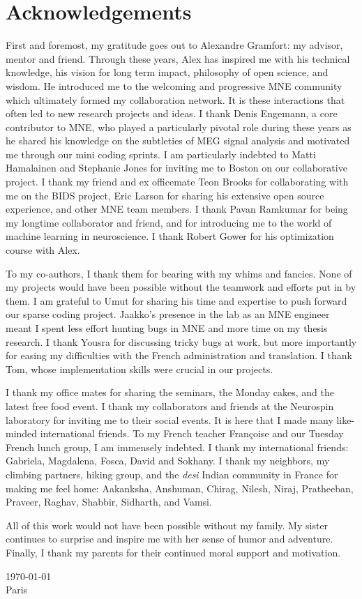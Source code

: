 \chapter*{Acknowledgements}
First and foremost, my gratitude goes out to Alexandre Gramfort: my advisor, mentor and friend. Through these years, Alex has inspired me with his technical knowledge, his vision for long term impact, philosophy of open science, and wisdom. He introduced me to the welcoming and progressive MNE community which ultimately formed my collaboration network. It is these interactions that often led to new research projects and ideas. I thank Denis Engemann, a core contributor to MNE, who played a particularly pivotal role during these years as he shared his knowledge on the subtleties of MEG signal analysis and motivated me through our mini coding sprints. I am particularly indebted to Matti Hamalainen and Stephanie Jones for inviting me to Boston on our collaborative project. I thank my friend and ex officemate Teon Brooks for collaborating with me on the BIDS project, Eric Larson for sharing his extensive open source experience, and other MNE team members. I thank Pavan Ramkumar for being my longtime collaborator and friend, and for introducing me to the world of machine learning in neuroscience. I thank Robert Gower for his optimization course with Alex.

To my co-authors, I thank them for bearing with my whims and fancies. None of my projects would have been possible without the teamwork and efforts put in by them. I am grateful to Umut for sharing his time and expertise to push forward our sparse coding project. Jaakko's presence in the lab as an MNE engineer meant I spent less effort hunting bugs in MNE and more time on my thesis research. I thank Yousra for discussing tricky bugs at work, but more importantly for easing my difficulties with the French administration and translation. I thank Tom, whose implementation skills were crucial in our projects. 

I thank my office mates for sharing the seminars, the Monday cakes, and the latest free food event. I thank my collaborators and friends at the Neurospin laboratory for inviting me to their social events. It is here that I made many like-minded international friends. To my French teacher Françoise and our Tuesday French lunch group, I am immensely indebted. I thank my international friends: Gabriela, Magdalena, Fosca, David and Sokhany. I thank my neighbors, my climbing partners, hiking group, and the \textit{desi} Indian community in France for making me feel home: Aakanksha, Anshuman, Chirag, Nilesh, Niraj, Pratheeban, Praveer, Raghav, Shabbir, Sidharth, and Vamsi.

All of this work would not have been possible without my family. My sister continues to surprise and inspire me with her sense of humor and adventure. Finally, I thank my parents for their continued moral support and motivation.

\today \\
Paris
